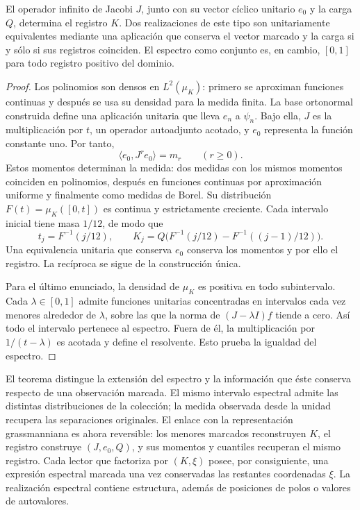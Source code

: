 \begin{theorem}
\label{thm:jacobi-marked-faithfulness}
El operador infinito de Jacobi \(J\), junto con su vector cíclico
unitario \(e_0\) y la carga \(Q\), determina el registro \(K\).
Dos realizaciones de este tipo son unitariamente equivalentes mediante
una aplicación que conserva el vector marcado y la carga si y sólo
si sus registros coinciden. El espectro como conjunto es, en cambio,
\([0,1]\) para todo registro positivo del dominio.
\end{theorem}
\begin{proof}
Los polinomios son densos en \(L^2(\mu_K)\): primero se aproximan
funciones continuas y después se usa su densidad para la medida finita.
La base ortonormal construida define una aplicación unitaria que lleva
\(e_n\) a \(\psi_n\). Bajo ella, \(J\) es la multiplicación por
\(t\), un operador autoadjunto acotado, y \(e_0\) representa la
función constante uno. Por tanto,
\[
 \langle e_0,J^re_0\rangle=m_r\qquad(r\geq0).
\]
Estos momentos determinan la medida: dos medidas con los mismos
momentos coinciden en polinomios, después en funciones continuas por
aproximación uniforme y finalmente como medidas de Borel.
Su distribución \(F(t)=\mu_K([0,t])\) es continua y estrictamente
creciente. Cada intervalo inicial tiene masa \(1/12\), de modo que
\[
 t_j=F^{-1}(j/12),\qquad
 K_j=Q\bigl(F^{-1}(j/12)-F^{-1}((j-1)/12)\bigr).
\]
Una equivalencia unitaria que conserva \(e_0\) conserva los momentos
y por ello el registro. La recíproca se sigue de la construcción única.

Para el último enunciado, la densidad de \(\mu_K\) es positiva
en todo subintervalo. Cada \(\lambda\in[0,1]\) admite funciones
unitarias concentradas en intervalos cada vez menores alrededor de
\(\lambda\), sobre las que la norma de \((J-\lambda I)f\)
tiende a cero. Así todo el intervalo pertenece al espectro. Fuera de
él, la multiplicación por \(1/(t-\lambda)\) es acotada y define
el resolvente. Esto prueba la igualdad del espectro.
\end{proof}

El teorema distingue la extensión del espectro y la información que
éste conserva respecto de una observación marcada. El mismo intervalo
espectral admite las distintas distribuciones de la colección; la medida
observada desde la unidad recupera las separaciones originales. El
enlace con la representación grassmanniana es ahora reversible:
los menores marcados reconstruyen \(K\), el registro construye
\((J,e_0,Q)\), y sus momentos y cuantiles recuperan el mismo registro.
Cada lector que factoriza por \((K,\xi)\) posee, por consiguiente,
una expresión espectral marcada una vez conservadas las restantes
coordenadas \(\xi\). La realización espectral contiene estructura,
además de posiciones de polos o valores de autovalores.
